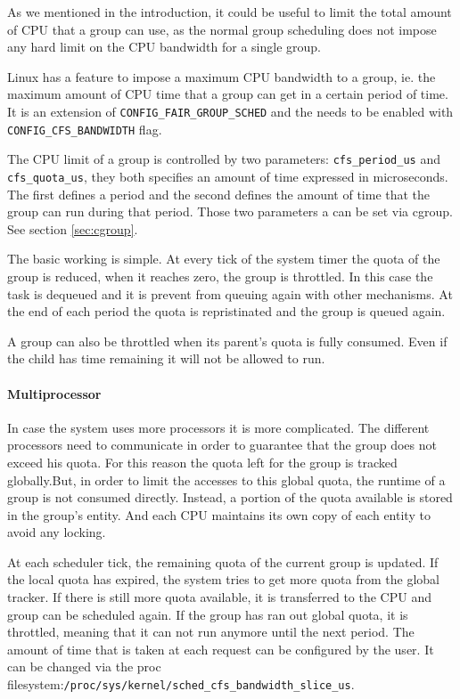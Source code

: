 As we mentioned in the introduction, it could be useful to limit the total amount of CPU that a group can use, as the normal group scheduling does not impose any hard limit on the CPU bandwidth for a single group. 

Linux has a feature to impose a maximum CPU bandwidth to a group, ie. the maximum amount of CPU time that a group can get in a certain period of time. It is an extension of \verb|CONFIG_FAIR_GROUP_SCHED| and the needs to be enabled with \verb|CONFIG_CFS_BANDWIDTH| flag.

The CPU limit of a group is controlled by two parameters:  \verb|cfs_period_us| and \verb|cfs_quota_us|, they both specifies an amount of time expressed in microseconds. The first defines a period and the second defines the amount of time that the group can run during that period. Those two parameters a can be set via cgroup. See section \ref{sec:cgroup}.

The basic working is simple. At every tick of the system timer the quota of the group is reduced, when it reaches zero, the group is throttled. In this case the task is dequeued and it is prevent from queuing again with other mechanisms. At the end of each period the quota is repristinated and the group is queued again.

A group can also be throttled when its parent's quota is fully consumed. Even if the child has time remaining it will not be allowed to run.

\paragraph{Multiprocessor}
In case the system uses more processors it is more complicated. The different processors need to communicate in order to guarantee that the group does not exceed his quota. For this reason the quota left for the group is tracked globally.But, in order to limit the accesses to this global quota, the runtime of a group is not consumed directly. Instead, a portion of the quota available is stored in the group's entity. And each CPU maintains its own copy of each entity to avoid any locking.

At each scheduler tick, the remaining quota of the current group is updated. If the local quota has expired, the system tries to get more quota from the global tracker. If there is still more quota available, it is transferred to the CPU and group can be scheduled again. If the group has ran out global quota, it is throttled, meaning that it can not run anymore until the next period. The amount of time that is taken at each request can be configured by the user. It can be changed via the proc filesystem:\verb|/proc/sys/kernel/sched_cfs_bandwidth_slice_us|.


